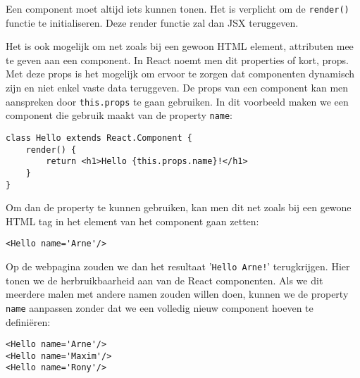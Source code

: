 Een component moet altijd iets kunnen tonen. Het is verplicht om de \lstinline[basicstyle=\ttfamily\color{red}]|render()| functie te initialiseren. Deze render functie zal dan JSX teruggeven.

Het is ook mogelijk om net zoals bij een gewoon HTML element, attributen mee te geven aan een component. In React noemt men dit properties of kort, props. Met deze props is het mogelijk om ervoor te zorgen dat componenten dynamisch zijn en niet enkel vaste data teruggeven. De props van een component kan men aanspreken door \lstinline[basicstyle=\ttfamily\color{red}]|this.props| te gaan gebruiken. In dit voorbeeld maken we een component die gebruik maakt van de property \lstinline[basicstyle=\ttfamily\color{red}]|name|:

\begin{lstlisting}[frame=single, caption=Het component Hello wordt gedefinieerd waarbij de property 'name' wordt gebruikt]
class Hello extends React.Component {
	render() {
		return <h1>Hello {this.props.name}!</h1>
	}
}
\end{lstlisting}

Om dan de property te kunnen gebruiken, kan men dit net zoals bij een gewone HTML tag in het element van het component gaan zetten:

\begin{lstlisting}[frame=single, caption=Het component Hello met de property name die een waarde toegewezen krijgt]
<Hello name='Arne'/>
\end{lstlisting}

Op de webpagina zouden we dan het resultaat '\lstinline[basicstyle=\ttfamily\color{red}]|Hello Arne!|' terugkrijgen. Hier tonen we de herbruikbaarheid aan van de React componenten. Als we dit meerdere malen met andere namen zouden willen doen, kunnen we de property \lstinline[basicstyle=\ttfamily\color{red}]|name| aanpassen zonder dat we een volledig nieuw component hoeven te definiëren:

\begin{lstlisting}[frame=single, caption=Het component Hello die meerdere malen met andere props wordt gebruikt.]
<Hello name='Arne'/>
<Hello name='Maxim'/>
<Hello name='Rony'/>
\end{lstlisting}


